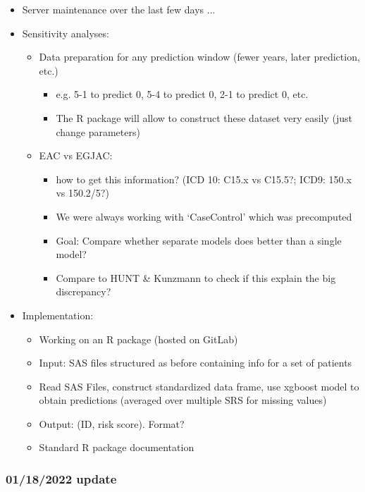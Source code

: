 \documentclass[12pt]{article}
\begin{document}
\begin{itemize}
	\item Server maintenance over the last few days ... 
	\item Sensitivity analyses:
		\begin{itemize}
			\item Data preparation for any prediction window (fewer years, later prediction, etc.)
			\begin{itemize}
				\item e.g. 5-1 to predict 0, 5-4 to predict 0, 2-1 to predict 0, etc.
				\item The R package will allow to construct these dataset very easily (just change parameters)
			\end{itemize}
			\item EAC vs EGJAC: 
			\begin{itemize}
			\item how to get this information? (ICD 10: C15.x vs C15.5?; ICD9: 150.x vs 150.2/5?) 
			\item We were always working with `CaseControl' which was precomputed
			\item Goal: Compare whether separate models does better than a single model? 
			\item Compare to HUNT \& Kunzmann to check if this explain the big discrepancy?
			\end{itemize}
		\end{itemize}
	\item Implementation:
		\begin{itemize}
			\item Working on an R package (hosted on GitLab)
			\item Input: SAS files structured as before containing info for a set of patients
			\item Read SAS Files, construct standardized data frame, 
			use xgboost model to obtain predictions (averaged over multiple SRS for missing values)
			\item Output: (ID, risk score). Format? 
			\item Standard R package documentation
		\end{itemize}
\end{itemize}



\pagebreak
\subsubsection*{01/18/2022 update}
\end{document}
